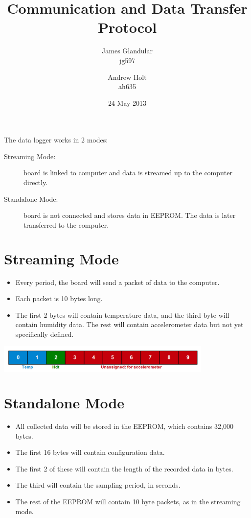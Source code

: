 \documentclass[a4paper,11pt]{article}  %
\title{Communication and Data Transfer Protocol}
\author{James Glandular\\ jg597 \and Andrew Holt\\ ah635}
\date{24 May 2013}
\begin{document}
\maketitle

\noindent The data logger works in 2 modes:

\begin{description}
  \item[Streaming Mode:] board is linked to computer and data is
    streamed up to the computer directly.
  \item[Standalone Mode:] board is not connected and stores data in
    EEPROM. The data is later transferred to the computer.
\end{description}

\section{Streaming Mode}

\begin{itemize}
  \item Every period, the board will send a packet of data to the
    computer.
  \item Each packet is 10 bytes long.
  \item The first 2 bytes will contain temperature data, and the third
    byte will contain humidity data. The rest will contain
    accelerometer data but not yet specifically defined.
\end{itemize}

\begin{center}
  \includegraphics[width=0.8\textwidth]{Packet_diagram.pdf}
\end{center}

\section{Standalone Mode}

\begin{itemize}
  \item All collected data will be stored in the EEPROM, which
    contains 32,000 bytes.
  \item The first 16 bytes will contain configuration data.
  \item The first 2 of these will contain the length of the recorded
    data in bytes.
  \item The third will contain the sampling period, in seconds.
  \item The rest of the EEPROM will contain 10 byte packets, as in the
    streaming mode.
\end{itemize}
\end{document}
